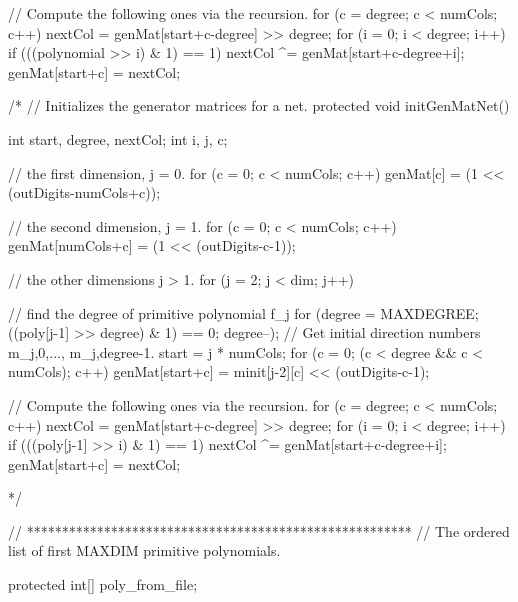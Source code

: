 \begin{code}
\begin{hide}
{{         // Compute the following ones via the recursion.
         for (c = degree; c < numCols; c++) {
            nextCol = genMat[start+c-degree] >> degree;
            for (i = 0; i < degree; i++)
               if (((polynomial >> i) & 1) == 1)
                  nextCol ^= genMat[start+c-degree+i];
            genMat[start+c] = nextCol;
         }
      } 
   }
    
/*
   // Initializes the generator matrices for a net.
   protected void initGenMatNet()  {
      int start, degree, nextCol;
      int i, j, c;

      // the first dimension, j = 0.
      for (c = 0; c < numCols; c++)
         genMat[c] = (1 << (outDigits-numCols+c));

      // the second dimension, j = 1.
      for (c = 0; c < numCols; c++)
         genMat[numCols+c] = (1 << (outDigits-c-1));

      // the other dimensions j > 1.
      for (j = 2; j < dim; j++) {
         // find the degree of primitive polynomial f_j
         for (degree = MAXDEGREE; ((poly[j-1] >> degree) & 1) == 0; degree--); 
         // Get initial direction numbers m_{j,0},..., m_{j,degree-1}.
         start = j * numCols;
         for (c = 0; (c < degree && c < numCols); c++)
            genMat[start+c] = minit[j-2][c] << (outDigits-c-1);

         // Compute the following ones via the recursion.
         for (c = degree; c < numCols; c++) {
            nextCol = genMat[start+c-degree] >> degree;
            for (i = 0; i < degree; i++)
               if (((poly[j-1] >> i) & 1) == 1)
                  nextCol ^= genMat[start+c-degree+i];
            genMat[start+c] = nextCol;
         }
      } 
   }
*/

    // *******************************************************
    // The ordered list of first MAXDIM primitive polynomials.

    protected int[] poly_from_file;


\end{hide}
\end{code}
